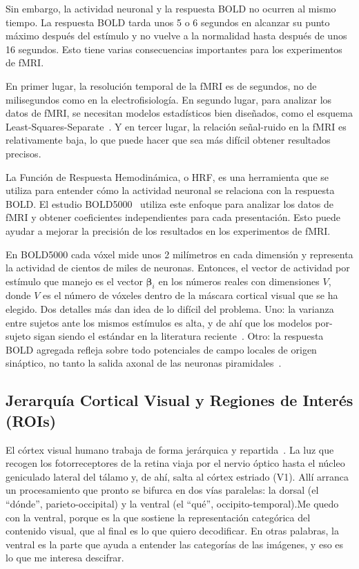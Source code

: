 Sin embargo, la actividad neuronal y la respuesta BOLD no ocurren al mismo tiempo. La respuesta 
BOLD tarda unos 5 o 6 segundos en alcanzar su punto máximo después del estímulo y no vuelve a la 
normalidad hasta después de unos 16 segundos. Esto tiene varias consecuencias importantes para los 
experimentos de fMRI.

En primer lugar, la resolución temporal de la fMRI es de segundos, no de milisegundos como en la 
electrofisiología. En segundo lugar, para analizar los datos de fMRI, se necesitan modelos 
estadísticos bien diseñados, como el esquema Least-Squares-Separate~\cite{mumford2012deconvolving}. Y en tercer lugar, la relación 
señal-ruido en la fMRI es relativamente baja, lo que puede hacer que sea más difícil obtener resultados 
precisos.

La Función de Respuesta Hemodinámica, o HRF, es una herramienta que se utiliza para entender cómo 
la actividad neuronal se relaciona con la respuesta BOLD. El estudio BOLD5000~\cite{chang2019bold5000} utiliza este enfoque 
para analizar los datos de fMRI y obtener coeficientes independientes para cada presentación. Esto 
puede ayudar a mejorar la precisión de los resultados en los experimentos de fMRI.

En BOLD5000 cada vóxel mide unos 2 milímetros en cada dimensión y representa la actividad de cientos 
de miles de neuronas. Entonces, el vector de actividad por estímulo que manejo es el vector 
$\boldsymbol{\beta}_i$ en los números reales con dimensiones $V$, donde $V$ es el número de vóxeles 
dentro de la máscara cortical visual que se ha elegido. 
Dos detalles más dan idea de lo difícil del problema. Uno: la varianza 
entre sujetos ante los mismos estímulos es alta, y de ahí que los modelos por-sujeto sigan 
siendo el estándar en la literatura reciente~\cite{scotti2023mindeye,scotti2024mindeye2,takagi2023,ozcelik2023}. 
Otro: la respuesta BOLD agregada refleja sobre todo potenciales de campo locales de origen 
sináptico, no tanto la salida axonal de las neuronas piramidales~\cite{logothetis2008what}.

\subsection{Jerarquía Cortical Visual y Regiones de Interés (ROIs)}

El córtex visual humano trabaja de forma jerárquica y repartida~\cite{felleman1991distributed,
dicarlo2012does}. La luz que recogen los fotorreceptores de la retina viaja por el nervio óptico 
hasta el núcleo geniculado lateral del tálamo y, de ahí, salta al córtex estriado (V1). Allí 
arranca un procesamiento que pronto se bifurca en dos vías paralelas: la dorsal (el ``dónde'', 
parieto-occipital) y la ventral (el ``qué'', occipito-temporal).Me quedo con la ventral, porque es la que sostiene la representación categórica del contenido visual, que al final es lo que quiero decodificar.
En otras palabras, la ventral es la parte que ayuda a entender las categorías de las imágenes, y eso es lo que me interesa descifrar.

